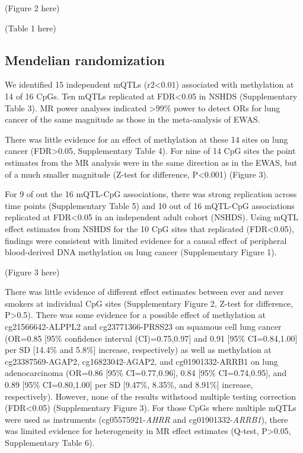 \documentclass[11pt,twoside]{bristolthesis}
\begin{document}
(Figure 2 here)

(Table 1 here)

\hypertarget{mendelian-randomization-2}{%
\subsection{Mendelian randomization}\label{mendelian-randomization-2}}

We identified 15 independent mQTLs (r2\textless0.01) associated with methylation at 14 of 16 CpGs. Ten mQTLs replicated at FDR\textless0.05 in NSHDS (Supplementary Table 3). MR power analyses indicated \textgreater99\% power to detect ORs for lung cancer of the same magnitude as those in the meta-analysis of EWAS.

There was little evidence for an effect of methylation at these 14 sites on lung cancer (FDR\textgreater0.05, Supplementary Table 4). For nine of 14 CpG sites the point estimates from the MR analysis were in the same direction as in the EWAS, but of a much smaller magnitude (Z-test for difference, P\textless0.001) (Figure 3).

For 9 of out the 16 mQTL-CpG associations, there was strong replication across time points (Supplementary Table 5) and 10 out of 16 mQTL-CpG associations replicated at FDR\textless0.05 in an independent adult cohort (NSHDS). Using mQTL effect estimates from NSHDS for the 10 CpG sites that replicated (FDR\textless0.05), findings were consistent with limited evidence for a causal effect of peripheral blood-derived DNA methylation on lung cancer (Supplementary Figure 1).

(Figure 3 here)

There was little evidence of different effect estimates between ever and never smokers at individual CpG sites (Supplementary Figure 2, Z-test for difference, P\textgreater0.5). There was some evidence for a possible effect of methylation at cg21566642-ALPPL2 and cg23771366-PRSS23 on squamous cell lung cancer (OR=0.85 {[}95\% confidence interval (CI)=0.75,0.97{]} and 0.91 {[}95\% CI=0.84,1.00{]} per SD {[}14.4\% and 5.8\%{]} increase, respectively) as well as methylation at cg23387569-AGAP2, cg16823042-AGAP2, and cg01901332-ARRB1 on lung adenocarcinoma (OR=0.86 {[}95\% CI=0.77,0.96{]}, 0.84 {[}95\% CI=0.74,0.95{]}, and 0.89 {[}95\% CI=0.80,1.00{]} per SD {[}9.47\%, 8.35\%, and 8.91\%{]} increase, respectively). However, none of the results withstood multiple testing correction (FDR\textless0.05) (Supplementary Figure 3). For those CpGs where multiple mQTLs were used as instruments (cg05575921-\emph{AHRR} and cg01901332-\emph{ARRB1}), there was limited evidence for heterogeneity in MR effect estimates (Q-test, P\textgreater0.05, Supplementary Table 6).
\end{document}
